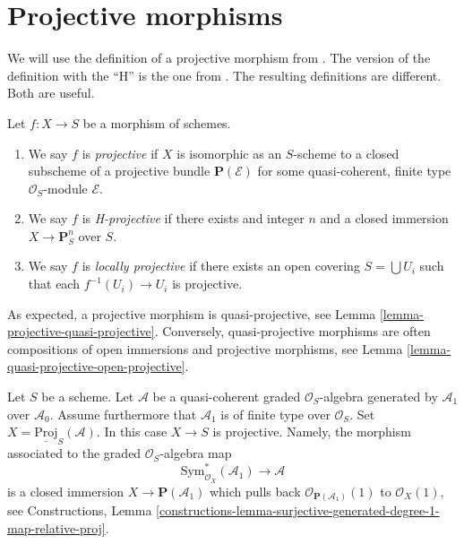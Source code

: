 \section{Projective morphisms}
\label{section-projective}

\noindent
We will use the definition of a projective morphism from \cite{EGA}.
The version of the definition with the ``H'' is the one
from \cite{H}. The resulting definitions are different. Both are useful.

\begin{definition}
\label{definition-projective}
Let $f : X \to S$ be a morphism of schemes.
\begin{enumerate}
\item We say $f$ is {\it projective} if $X$ is isomorphic as
an $S$-scheme to a closed subscheme of a projective
bundle $\mathbf{P}(\mathcal{E})$
for some quasi-coherent, finite type $\mathcal{O}_S$-module $\mathcal{E}$.
\item We say $f$ is {\it H-projective} if there exists and integer $n$ and
a closed immersion $X \to \mathbf{P}^n_S$ over $S$.
\item We say $f$ is {\it locally projective} if there exists an open
covering $S = \bigcup U_i$ such that each $f^{-1}(U_i) \to U_i$ is
projective.
\end{enumerate}
\end{definition}

\noindent
As expected, a projective morphism is quasi-projective, see
Lemma \ref{lemma-projective-quasi-projective}.
Conversely, quasi-projective morphisms are often compositions
of open immersions and projective morphisms, see
Lemma \ref{lemma-quasi-projective-open-projective}.

\begin{example}
\label{example-projective}
Let $S$ be a scheme. Let $\mathcal{A}$ be a quasi-coherent graded
$\mathcal{O}_S$-algebra generated by $\mathcal{A}_1$ over $\mathcal{A}_0$.
Assume furthermore that $\mathcal{A}_1$ is of finite type over
$\mathcal{O}_S$. Set $X = \underline{\text{Proj}}_S(\mathcal{A})$.
In this case $X \to S$ is projective. Namely,
the morphism associated to the graded $\mathcal{O}_S$-algebra map
$$
\text{Sym}_{\mathcal{O}_X}^*(\mathcal{A}_1)
\longrightarrow
\mathcal{A}
$$
is a closed immersion $X \to \mathbf{P}(\mathcal{A}_1)$ which pulls back
$\mathcal{O}_{\mathbf{P}(\mathcal{A}_1)}(1)$ to $\mathcal{O}_X(1)$, see
Constructions, Lemma
\ref{constructions-lemma-surjective-generated-degree-1-map-relative-proj}.
\end{example}
 
